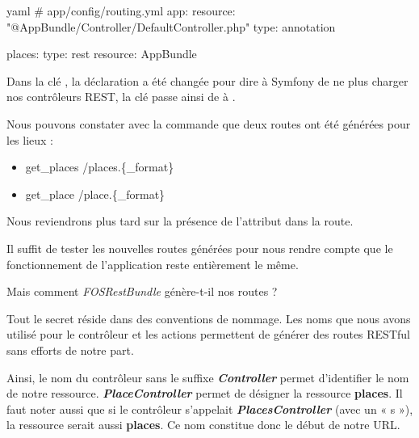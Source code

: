 \documentclass[big]{zmdocument}
\begin{document}
\begin{CodeBlock}{yaml}
# app/config/routing.yml
app:
    resource: "@AppBundle/Controller/DefaultController.php"
    type:     annotation

places:
    type:     rest
    resource: AppBundle\Controller\PlaceController
\end{CodeBlock}



\begin{Warning}
Dans la clé , la déclaration a été changée pour dire à Symfony de ne plus charger nos contrôleurs REST, la clé  passe ainsi de  à .
\end{Warning}


Nous pouvons constater avec la commande  que deux routes ont été générées pour les lieux :



\begin{itemize}
\item get\_places /places.\{\_format\}
\item get\_place  /place.\{\_format\}
\end{itemize}


Nous reviendrons plus tard sur la présence de l'attribut  dans la route.



Il suffit de tester les nouvelles routes générées pour nous rendre compte que le fonctionnement de l'application reste entièrement le même.



\begin{Question}
Mais comment \textit{FOSRestBundle} génère-t-il nos routes ?
\end{Question}


Tout le secret réside dans des conventions de nommage. Les noms que nous avons utilisé pour le contrôleur et les actions permettent de générer des routes RESTful sans efforts de notre part.



Ainsi, le nom du contrôleur sans le suffixe \textbf{\textit{Controller}} permet d'identifier le nom de notre ressource. \textbf{\textit{PlaceController}} permet de désigner la ressource \textbf{places}. Il faut noter aussi que si le contrôleur s'appelait \textbf{\textit{PlacesController}} (avec un « s »), la ressource serait aussi \textbf{places}. Ce nom constitue donc le début de notre URL.
\end{document}

